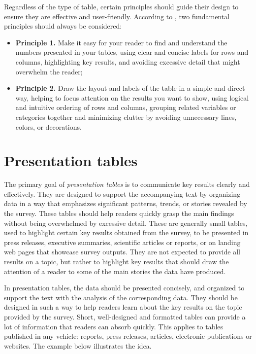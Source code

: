 \documentclass[
  12pt,
]{book}
\begin{document}
Regardless of the type of table, certain principles should guide their design to ensure they are effective and user-friendly. According to \citet{miller2004chicago}, two fundamental principles should always be considered:

\begin{itemize}
\item
  \textbf{Principle 1.} Make it easy for your reader to find and understand the numbers presented in your tables, using clear and concise labels for rows and columns,
  highlighting key results, and avoiding excessive detail that might overwhelm the reader;
\item
  \textbf{Principle 2.} Draw the layout and labels of the table in a simple and direct way, helping to focus attention on the results you want to show, using logical and intuitive ordering of rows and columns, grouping related variables or categories together and minimizing clutter by avoiding unnecessary lines, colors, or decorations.
\end{itemize}

\hypertarget{presentation-tables}{%
\section{Presentation tables}\label{presentation-tables}}

The primary goal of \emph{presentation tables} is to communicate key results clearly and effectively. They are designed to support the accompanying text by organizing data in a way that emphasizes significant patterns, trends, or stories revealed by the survey. These tables should help readers quickly grasp the main findings without being overwhelmed by excessive detail. These are generally small tables, used to highlight certain key results obtained from the survey, to be presented in press releases, executive summaries, scientific articles or reports, or on landing web pages that showcase survey outputs. They are not expected to provide all results on a topic, but rather to highlight key results that should draw the attention of a reader to some of the main stories the data have produced.

In presentation tables, the data should be presented concisely, and organized to support the text with the analysis of the corresponding data. They should be designed in such a way to help readers learn about the key results on the topic provided by the survey. Short, well-designed and formatted tables can provide a lot of information that readers can absorb quickly. This applies to tables published in any vehicle: reports, press releases, articles, electronic publications or websites. The example below illustrates the idea.
\end{document}
